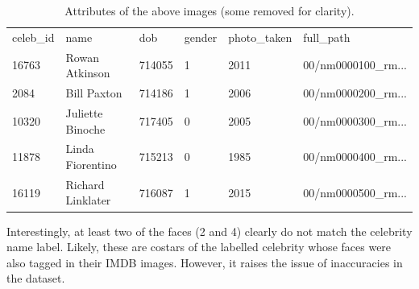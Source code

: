 \documentclass{article}
\begin{document}
\begin{table}[H]
\small
\centering
\caption{Attributes of the above images (some removed for clarity).}
\begin{tabular}{llllll}
celeb\_id & name & dob & gender & photo\_taken & full\_path \\
16763 & Rowan Atkinson & 714055 & 1 & 2011 & 00/nm0000100\_rm... \\
2084 & Bill Paxton & 714186 & 1 & 2006 & 00/nm0000200\_rm... \\
10320 & Juliette Binoche & 717405 & 0 & 2005 & 00/nm0000300\_rm... \\
11878 & Linda Fiorentino & 715213 & 0 & 1985 & 00/nm0000400\_rm... \\
16119 & Richard Linklater & 716087 & 1 & 2015 & 00/nm0000500\_rm... \\
\end{tabular}
\end{table}
\noindent Interestingly, at least two of the faces (2 and 4) clearly do not match the celebrity name label. Likely, these are costars of the labelled celebrity whose faces were also tagged in their IMDB images. However, it raises the issue of inaccuracies in the dataset.
\end{document}
